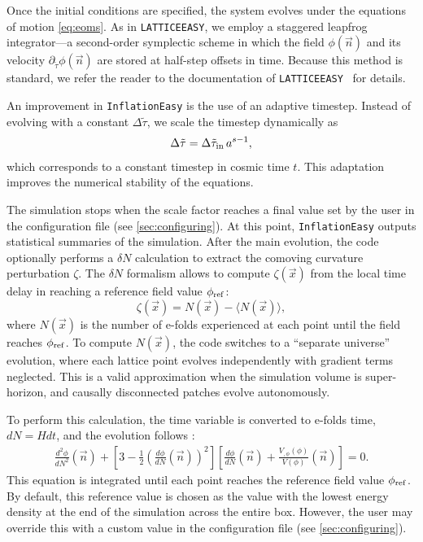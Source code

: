 \documentclass[aps, nofootinbib,superscriptaddress, preprintnumbers, longbibliography]{article}
\begin{document}
Once the initial conditions are specified, the system evolves under the equations of motion \cref{eq:eoms}. As in \texttt{LATTICEEASY}, we employ a staggered leapfrog integrator—a second-order symplectic scheme in which the field $\phi(\vec{n})$ and its velocity $\partial_{\tilde\tau} \phi(\vec{n})$ are stored at half-step offsets in time. Because this method is standard, we refer the reader to the documentation of \texttt{LATTICEEASY}~\cite{latticeeasy} for details.

An improvement in \texttt{InflationEasy} is the use of an adaptive timestep. Instead of evolving with a constant $\Delta \tilde{\tau}$, we scale the timestep dynamically as
\begin{equation}
\Delta \tilde{\tau} = \Delta \tilde{\tau}_{\rm in} \, a^{s-1},
\end{equation}
which corresponds to a constant timestep in cosmic time $t$. This adaptation improves the numerical stability of the equations.

The simulation stops when the scale factor reaches a final value set by the user in the configuration file (see \cref{sec:configuring}). At this point, \texttt{InflationEasy} outputs statistical summaries of the simulation. After the main evolution, the code optionally performs a $\delta N$ calculation to extract the comoving curvature perturbation $\zeta$. The $\delta N$ formalism allows to compute $\zeta(\vec{x})$ from the local time delay in reaching a reference field value $\phi_{\rm ref}$:
\begin{equation}
\zeta(\vec{x}) = N(\vec{x}) - \langle N(\vec{x}) \rangle,
\end{equation}
where $N(\vec{x})$ is the number of e-folds experienced at each point until the field reaches $\phi_{\rm ref}$. To compute $N(\vec{x})$, the code switches to a ``separate universe” evolution, where each lattice point evolves independently with gradient terms neglected. This is a valid approximation when the simulation volume is super-horizon, and causally disconnected patches evolve autonomously.

To perform this calculation, the time variable is converted to e-folds time, $dN = H dt$, and the evolution follows \cite{Caravano:2024moy,USR2}:
\begin{align}
\label{eq:eom_deltaN}
\frac{d^2\phi}{dN^2}(\vec{n}) + \left[3 - \frac{1}{2}\left(\frac{d\phi}{dN}(\vec{n})\right)^2 \right]
\left[ \frac{d\phi}{dN}(\vec{n}) + \frac{V_{,\phi}(\phi)}{V(\phi)}(\vec{n}) \right] = 0.
\end{align}
This equation is integrated until each point reaches the reference field value $\phi_{\rm ref}$. By default, this reference value is chosen as the value with the lowest energy density at the end of the simulation across the entire box. However, the user may override this with a custom value in the configuration file (see \cref{sec:configuring}).
\end{document}
